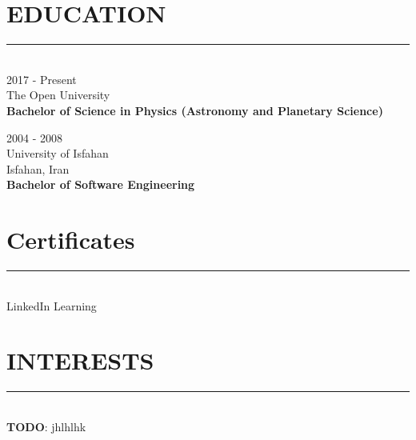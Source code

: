\documentclass[10pt,a4paper]{article}
\begin{document}
\section{EDUCATION}
\noindent \rule {18.0cm}{0.2pt} \\
\textbullet \hspace{0.1cm} 2017 - Present \\
The Open University \\
\textbf{Bachelor of Science in Physics (Astronomy and Planetary Science)}
\vspace{0.3cm}

\noindent \textbullet \hspace{0.1cm}  2004 - 2008 \\
University of Isfahan \\
Isfahan, Iran \\
\textbf{Bachelor of Software Engineering}

\section{Certificates}
\noindent \rule {18.0cm}{0.2pt} \\
LinkedIn Learning


\section{INTERESTS}
\noindent \rule {18.0cm}{0.2pt} \\
\textbullet \hspace{0.1cm} \textbf{TODO}: jhlhlhk \\
\end{document}
